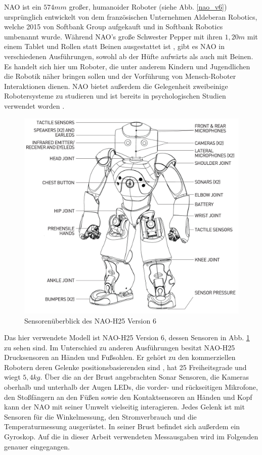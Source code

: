 NAO ist ein $574 \unit{mm}$ großer, humanoider Roboter (siehe Abb. \ref{nao_v6}) ursprünglich entwickelt von dem französischen Unternehmen Aldeberan Robotics, welche 2015 von Softbank Group aufgekauft \cite{aldebaran_to_softbank} und in Softbank Robotics umbenannt wurde. Während NAO's große Schwester Pepper mit ihren $1,20 \unit{m}$ mit einem Tablet und Rollen statt Beinen ausgestattet ist \cite{about_pepper}, gibt es NAO in verschiedenen Ausführungen, sowohl ab der Hüfte aufwärts als auch mit Beinen. Es handelt sich hier um Roboter, die unter anderem Kindern und Jugendlichen die Robotik näher bringen sollen und der Vorführung von Mensch-Roboter Interaktionen dienen. NAO bietet außerdem die Gelegenheit zweibeinige Robotersysteme zu studieren und ist bereits in psychologischen Studien verwendet worden \cite{SHAMSUDDIN20121533}. 

\begin{figure}[hb]
	\centering
	\vspace{2cm}
	\includegraphics[width=0.75\linewidth]{Bilder/nao_h25_pres.png}
	\caption{Sensorenüberblick des NAO-H25 Version 6 \cite[in /H25]{nao_naoqi_docu}}
	\label{nao_v6_h25}
\end{figure}  

Das hier verwendete Modell ist NAO-H25 Version 6, dessen Sensoren in Abb. \ref{nao_v6_h25} zu sehen sind. Im Unterschied zu anderen Ausführungen besitzt NAO-H25 Drucksensoren an Händen und Fußsohlen. Er gehört zu den kommerziellen Robotern deren Gelenke positionsbasierenden sind \cite{balance_strategy}, hat 25 Freiheitsgrade und wiegt $5,4\unit{kg}$. Über die an der Brust angebrachten Sonar Sensoren, die Kameras oberhalb und unterhalb der Augen LEDs, die vorder- und rückseitigen Mikrofone, den Stoßfängern an den Füßen sowie den Kontaktsensoren an Händen und Kopf kann der NAO mit seiner Umwelt vielseitig interagieren. Jedes Gelenk ist mit Sensoren für die Winkelmessung, den Stromverbrauch und die Temperaturmessung ausgerüstet. In seiner Brust befindet sich außerdem ein Gyroskop. Auf die in dieser Arbeit verwendeten Messausgaben wird im Folgenden genauer eingegangen.

